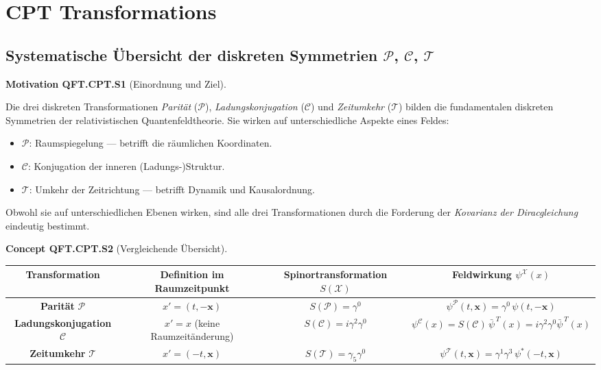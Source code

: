 \documentclass[10pt, letterpaper]{article}
\newcommand{\CustomHeading}[3]{%
  \par\medskip\noindent%
  \textbf{#1 #2} \textnormal{(#3)}.\enskip%
}
\newenvironment{CONC}[2]{\begin{unitbox}\CustomHeading{Concept}{#1}{#2}}{\end{unitbox}}
\newenvironment{MOT}[2]{\begin{unitbox}\CustomHeading{Motivation}{#1}{#2}}{\end{unitbox}}
\begin{document}
\pagebreak

\section{CPT Transformations}

\subsection{Systematische Übersicht der diskreten Symmetrien $\mathcal P$, $\mathcal C$, $\mathcal T$}

\begin{MOT}{QFT.CPT.S1}{Einordnung und Ziel}
Die drei diskreten Transformationen \emph{Parität} ($\mathcal P$), \emph{Ladungskonjugation} ($\mathcal C$) und \emph{Zeitumkehr} ($\mathcal T$) bilden die fundamentalen diskreten Symmetrien der relativistischen Quantenfeldtheorie.  
Sie wirken auf unterschiedliche Aspekte eines Feldes:
\begin{itemize}
  \item $\mathcal P$: Raumspiegelung — betrifft die räumlichen Koordinaten.
  \item $\mathcal C$: Konjugation der inneren (Ladungs-)Struktur.
  \item $\mathcal T$: Umkehr der Zeitrichtung — betrifft Dynamik und Kausalordnung.
\end{itemize}
Obwohl sie auf unterschiedlichen Ebenen wirken, sind alle drei Transformationen durch die Forderung der \emph{Kovarianz der Diracgleichung} eindeutig bestimmt.
\end{MOT}

\begin{CONC}{QFT.CPT.S2}{Vergleichende Übersicht}

\renewcommand{\arraystretch}{1.4}
\begin{center}
\begin{tabular}{|c|c|c|c|}
\hline
\textbf{Transformation} & \textbf{Definition im Raumzeitpunkt} & \textbf{Spinortransformation} $S(\mathcal X)$ & \textbf{Feldwirkung} $\psi^{\mathcal X}(x)$ \\ \hline
\textbf{Parität} $\mathcal P$ &
$x'=(t,-\mathbf x)$ &
$S(\mathcal P)=\gamma^0$ &
$\psi^{\mathcal P}(t,\mathbf x)=\gamma^0\,\psi(t,-\mathbf x)$ \\ \hline
\textbf{Ladungskonjugation} $\mathcal C$ &
$x'=x$ (keine Raumzeitänderung) &
$S(\mathcal C)=i\gamma^2\gamma^0$ &
$\psi^{\mathcal C}(x)=S(\mathcal C)\,\bar\psi^{\,T}(x)=i\gamma^2\gamma^0\bar\psi^{\,T}(x)$ \\ \hline
\textbf{Zeitumkehr} $\mathcal T$ &
$x'=(-t,\mathbf x)$ &
$S(\mathcal T)=\gamma_5\gamma^0$ &
$\psi^{\mathcal T}(t,\mathbf x)=\gamma^1\gamma^3\,\psi^*(-t,\mathbf x)$ \\ \hline
\end{tabular}
\end{center}

\end{CONC}
\end{document}

